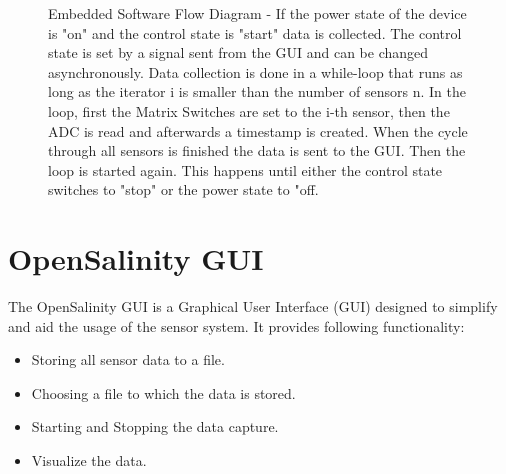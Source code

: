 \begin{figure}
\begin{center}
		\caption{Embedded Software Flow Diagram - If the power state of the device is "on" and  the control state is "start" data is collected. The control state is set by a signal sent from the GUI and can be changed asynchronously. Data collection is done in a while-loop that runs as long as the iterator i is smaller than the number of sensors n. In the loop, first the Matrix Switches are set to the i-th sensor, then the ADC is read and afterwards a timestamp is created. When the cycle through all sensors is finished the data is sent to the GUI. Then the loop is started again. This happens until either the control state switches to "stop" or the power state to "off.}
		\label{fig:flow}
	\end{center}
\end{figure}

\section{OpenSalinity GUI}

The OpenSalinity GUI is a Graphical User Interface (GUI) designed to simplify and aid the usage of the sensor system. It provides following functionality:

\begin{itemize}
	\item Storing all sensor data to a file.
	\item Choosing a file to which the data is stored.
	\item Starting and Stopping the data capture.
	\item Visualize the data.
\end{itemize}


